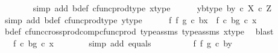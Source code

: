 \begin{isabellebody}
\ \ \ \ \ \ \isamarkupfalse%
\ {\isacharparenleft}{\kern0pt}simp\ add{\isacharcolon}{\kern0pt}\ b{\isacharunderscore}{\kern0pt}def\ cfunc{\isacharunderscore}{\kern0pt}prod{\isacharunderscore}{\kern0pt}type\ x{\isacharunderscore}{\kern0pt}type{}{\isacharparenright}{\kern0pt}\isanewline
\ \ \ \ \isamarkupfalse%
\ yb{\isacharunderscore}{\kern0pt}type{\isacharcolon}{\kern0pt}\ {\isachardoublequoteopen}{\isasymlangle}b{\isacharcomma}{\kern0pt}y{\isasymrangle}\ {\isasymin}\isactrlsub c\ X\ {\isasymtimes}\isactrlsub c\ Z{\isachardoublequoteclose}\isanewline
\ \ \ \ \ \ \isamarkupfalse%
\ {\isacharparenleft}{\kern0pt}simp\ add{\isacharcolon}{\kern0pt}\ b{\isacharunderscore}{\kern0pt}def\ cfunc{\isacharunderscore}{\kern0pt}prod{\isacharunderscore}{\kern0pt}type\ y{\isacharunderscore}{\kern0pt}type{}{\isacharparenright}{\kern0pt}\isanewline
\ \ \ \ \isamarkupfalse%
\ {\isachardoublequoteopen}{\isacharparenleft}{\kern0pt}f\ {\isasymtimes}\isactrlsub f\ g{\isacharparenright}{\kern0pt}\ {\isasymcirc}\isactrlsub c\ {\isasymlangle}b{\isacharcomma}{\kern0pt}x{\isasymrangle}\ {\isacharequal}{\kern0pt}\ {\isasymlangle}f\ {\isasymcirc}\isactrlsub c\ b{\isacharcomma}{\kern0pt}g\ {\isasymcirc}\isactrlsub c\ x{\isasymrangle}{\isachardoublequoteclose}\isanewline
\ \ \ \ \ \ \isamarkupfalse%
\ b{\isacharunderscore}{\kern0pt}def\ cfunc{\isacharunderscore}{\kern0pt}cross{\isacharunderscore}{\kern0pt}prod{\isacharunderscore}{\kern0pt}comp{\isacharunderscore}{\kern0pt}cfunc{\isacharunderscore}{\kern0pt}prod\ type{\isacharunderscore}{\kern0pt}assms{\isacharparenleft}{\kern0pt}{}{\isacharparenright}{\kern0pt}\ type{\isacharunderscore}{\kern0pt}assms{\isacharparenleft}{\kern0pt}{}{\isacharparenright}{\kern0pt}\ x{\isacharunderscore}{\kern0pt}type{}\ \isamarkupfalse%
\ blast\isanewline
\ \ \ \ \isamarkupfalse%
\ \isamarkupfalse%
\ {\isachardoublequoteopen}{\isachardot}{\kern0pt}{\isachardot}{\kern0pt}{\isachardot}{\kern0pt}\ {\isacharequal}{\kern0pt}\ {\isasymlangle}f\ {\isasymcirc}\isactrlsub c\ b{\isacharcomma}{\kern0pt}g\ {\isasymcirc}\isactrlsub c\ x{\isasymrangle}{\isachardoublequoteclose}\isanewline
\ \ \ \ \ \ \isamarkupfalse%
\ {\isacharparenleft}{\kern0pt}simp\ add{\isacharcolon}{\kern0pt}\ equals{\isacharparenright}{\kern0pt}\isanewline
\ \ \ \ \isamarkupfalse%
\ \isamarkupfalse%
\ {\isachardoublequoteopen}{\isachardot}{\kern0pt}{\isachardot}{\kern0pt}{\isachardot}{\kern0pt}\ {\isacharequal}{\kern0pt}\ {\isacharparenleft}{\kern0pt}f\ {\isasymtimes}\isactrlsub f\ g{\isacharparenright}{\kern0pt}\ {\isasymcirc}\isactrlsub c\ {\isasymlangle}b{\isacharcomma}{\kern0pt}y{\isasymrangle}{\isachardoublequoteclose}\isanewline

\end{isabellebody}
